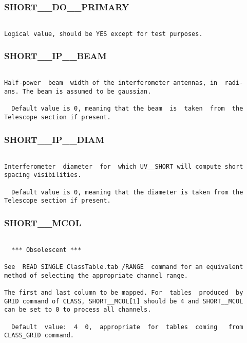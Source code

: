 \subsubsection{SHORT\_\_DO\_\_PRIMARY}
\begin{verbatim}

Logical value, should be YES except for test purposes.

\end{verbatim}
\subsubsection{SHORT\_\_IP\_\_BEAM}
\begin{verbatim}

Half-power  beam  width of the interferometer antennas, in  radi-
ans. The beam is assumed to be gaussian.

  Default value is 0, meaning that the beam  is  taken  from  the
Telescope section if present.

\end{verbatim}
\subsubsection{SHORT\_\_IP\_\_DIAM}
\begin{verbatim}

Interferometer  diameter  for  which UV__SHORT will compute short
spacing visibilities.

  Default value is 0, meaning that the diameter is taken from the
Telescope section if present.

\end{verbatim}
\subsubsection{SHORT\_\_MCOL}
\begin{verbatim}

  *** Obsolescent ***

See  READ SINGLE ClassTable.tab /RANGE  command for an equivalent
method of selecting the appropriate channel range.

The first and last column to be mapped. For  tables  produced  by
GRID command of CLASS, SHORT__MCOL[1] should be 4 and SHORT__MCOL
can be set to 0 to process all channels.

  Default  value:  4  0,  appropriate  for  tables  coming   from
CLASS_GRID command.


\end{verbatim}
